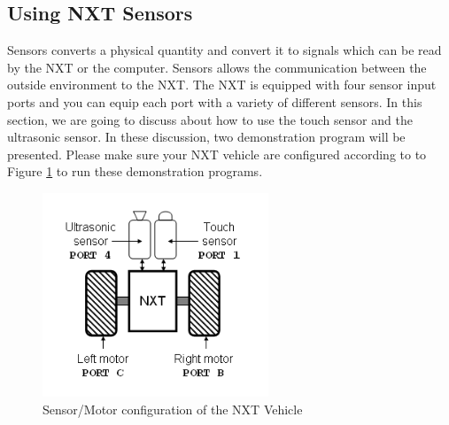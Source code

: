 \subsection{Using NXT Sensors}
Sensors converts a physical quantity and convert it to signals which can be read by the NXT or the computer. 
Sensors allows the communication between the outside environment to the NXT. The NXT is equipped with four 
sensor input ports and you can equip each port with a variety of different sensors. In this section, we are 
going to discuss about how to use the touch sensor and the ultrasonic sensor. In these discussion, two 
demonstration program will be presented. Please make sure your NXT vehicle are configured according to to 
Figure \ref{fig_NXT_sensport} to run these demonstration programs.
\begin{figure}[h]
  \begin{center}
    \includegraphics[height=2.4in]{figure/mindstorm/NXT_auto.png}
    \caption{Sensor/Motor configuration of the NXT Vehicle \label{fig_NXT_sensport}}
  \end{center}
\end{figure}
